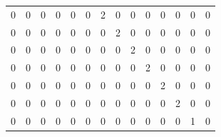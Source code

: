 \documentclass[10pt,twocolumn,letterpaper]{article}
\begin{document}
\begin{table}[h]
\begin{tabular}{llllllllllllll}
0                         & 0                         & 0                         & 0                         & 0                         & 0                         & \cellcolor[HTML]{9AFF99}2 & 0                         & 0                         & 0                         & 0                         & 0                         & 0                         & 0                         \\
0                         & 0                         & 0                         & 0                         & 0                         & 0                         & 0                         & \cellcolor[HTML]{9AFF99}2 & 0                         & 0                         & 0                         & 0                         & 0                         & 0                         \\
0                         & 0                         & 0                         & 0                         & 0                         & 0                         & 0                         & 0                         & \cellcolor[HTML]{9AFF99}2 & 0                         & 0                         & 0                         & 0                         & 0                         \\
0                         & 0                         & 0                         & 0                         & 0                         & 0                         & 0                         & 0                         & 0                         & \cellcolor[HTML]{9AFF99}2 & 0                         & 0                         & 0                         & 0                         \\
0                         & 0                         & 0                         & 0                         & 0                         & 0                         & 0                         & 0                         & 0                         & 0                         & \cellcolor[HTML]{9AFF99}2 & 0                         & 0                         & 0                         \\
0                         & 0                         & 0                         & 0                         & 0                         & 0                         & 0                         & 0                         & 0                         & 0                         & 0                         & \cellcolor[HTML]{9AFF99}2 & 0                         & 0                         \\
0                         & 0                         & 0                         & 0                         & 0                         & 0                         & 0                         & 0                         & 0                         & 0                         & 0                         & 0                         & \cellcolor[HTML]{9AFF99}1 & 0                         \\

\end{tabular}
\end{table}
\end{document}
